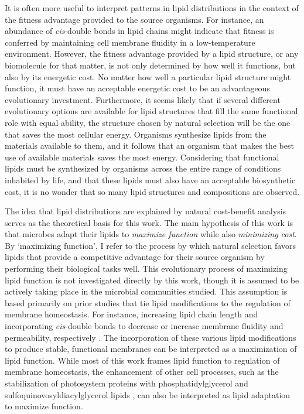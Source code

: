 It is often more useful to interpret patterns in lipid distributions in the context of the fitness advantage provided to the source organisms. For instance, an abundance of \textit{cis}-double bonds in lipid chains might indicate that fitness is conferred by maintaining cell membrane fluidity in a low-temperature environment. However, the fitness advantage provided by a lipid structure, or any biomolecule for that matter, is not only determined by how well it functions, but also by its energetic cost. No matter how well a particular lipid structure might function, it must have an acceptable energetic cost to be an advantageous evolutionary investment. Furthermore, it seems likely that if several different evolutionary options are available for lipid structures that fill the same functional role with equal ability, the structure chosen by natural selection will be the one that saves the most cellular energy. Organisms synthesize lipids from the materials available to them, and it follows that an organism that makes the best use of available materials saves the most energy. Considering that functional lipids must be synthesized by organisms across the entire range of conditions inhabited by life, and that these lipids must also have an acceptable biosynthetic cost, it is no wonder that so many lipid structures and compositions are observed. 

The idea that lipid distributions are explained by natural cost-benefit analysis serves as the theoretical basis for this work. The main hypothesis of this work is that microbes adapt their lipids to \textit{maximize function} while also \textit{minimizing cost}. By `maximizing function', I refer to the process by which natural selection favors lipids that provide a competitive advantage for their source organism by performing their biological tasks well. This evolutionary process of maximizing lipid function is not investigated directly by this work, though it is assumed to be actively taking place in the microbial communities studied. This assumption is based primarily on prior studies that tie lipid modifications to the regulation of membrane homeostasis. For instance, increasing lipid chain length and incorporating \textit{cis}-double bonds to decrease or increase membrane fluidity and permeability, respectively \citep[see review by][]{zhang2008membrane}. The incorporation of these various lipid modifications to produce stable, functional membranes can be interpreted as a maximization of lipid function. While most of this work frames lipid function to regulation of membrane homeostasis, the enhancement of other cell processes, such as the stabilization of photosystem proteins with phosphatidylglycerol and sulfoquinovosyldiacylglycerol lipids \citep{sato2004roles}, can also be interpreted as lipid adaptation to maximize function.

